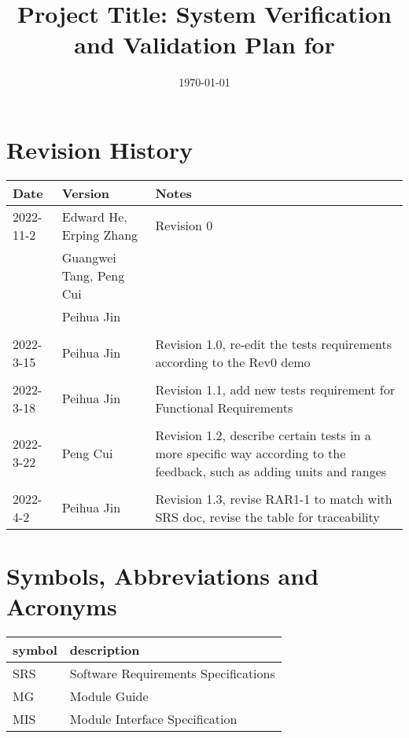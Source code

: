 \documentclass[12pt, titlepage]{article}
\begin{document}
\title{Project Title: System Verification and Validation Plan for \progname{}} 
\author{\authname}
\date{\today}
	
\maketitle


\section{Revision History}

\begin{tabularx}{\textwidth}{p{3cm}p{3cm}X}
\toprule {\bf Date} & {\bf Version} & {\bf Notes}\\
\midrule
2022-11-2 & Edward He, Erping Zhang & Revision 0\\
& Guangwei Tang, Peng Cui & \\
& Peihua Jin & \\
\\
2022-3-15 & Peihua Jin & Revision 1.0, re-edit the tests requirements according to the Rev0 demo\\
\\
2022-3-18 & Peihua Jin & Revision 1.1, add new tests requirement for Functional Requirements\\
\\
2022-3-22 & Peng Cui & Revision 1.2, describe certain tests in a more specific way according to the feedback, such as adding units and ranges\\
\\
2022-4-2 & Peihua Jin & Revision 1.3, revise RAR1-1 to match with SRS doc, revise the table for traceability\\



\bottomrule
\end{tabularx}

\newpage

\tableofcontents

\listoftables


\newpage

\section{Symbols, Abbreviations and Acronyms}

\renewcommand{\arraystretch}{1.2}
\begin{tabular}{l l} 
  \toprule		
  \textbf{symbol} & \textbf{description}\\
  \midrule 
  SRS & Software Requirements Specifications\\
  MG & Module Guide\\
  MIS & Module Interface Specification\\
  \bottomrule
\end{tabular}\\
\end{document}
